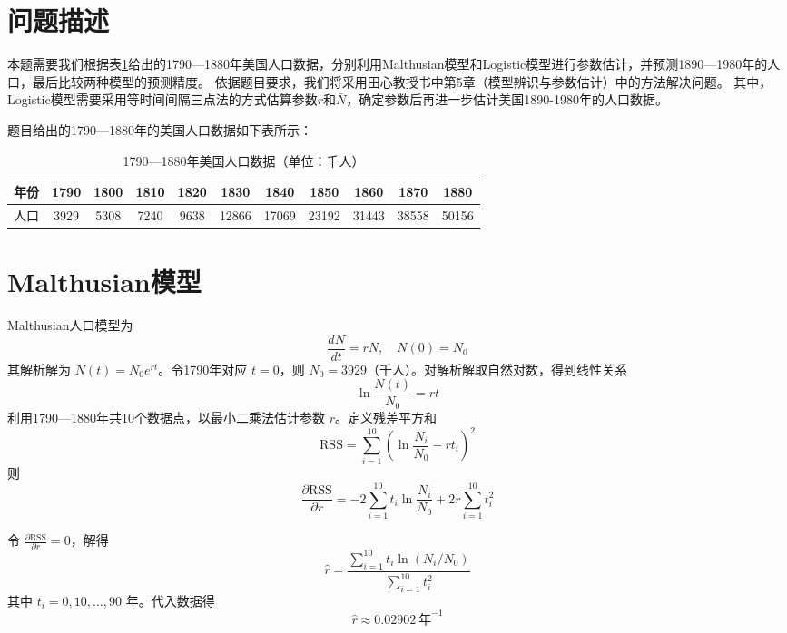 \section{问题描述}
本题需要我们根据表\ref{tab:data}给出的1790—1880年美国人口数据，分别利用Malthusian模型和Logistic模型进行参数估计，并预测1890—1980年的人口，最后比较两种模型的预测精度。
依据题目要求，我们将采用田心教授\cite{tianxin}书中第5章（模型辨识与参数估计）中的方法解决问题。
其中，Logistic模型需要采用等时间间隔三点法的方式估算参数$r$和$\bar{N}$，确定参数后再进一步估计美国1890-1980年的人口数据。
\par
题目给出的1790—1880年的美国人口数据如下表所示：
\begin{table}[h]
\centering
\caption{1790—1880年美国人口数据（单位：千人）}
\label{tab:data}
\begin{tabular}{ccccccccccc}
\toprule
年份 & 1790 & 1800 & 1810 & 1820 & 1830 & 1840 & 1850 & 1860 & 1870 & 1880 \\
\midrule
人口 & 3929 & 5308 & 7240 & 9638 & 12866 & 17069 & 23192 & 31443 & 38558 & 50156 \\
\bottomrule
\end{tabular}
\end{table}

\section{Malthusian模型}
Malthusian人口模型为
\begin{equation}
    \frac{dN}{dt} = rN,\quad N(0)=N_0
\end{equation}
其解析解为 $N(t)=N_0 e^{rt}$。令1790年对应 $t=0$，则 $N_0=3929$（千人）。对解析解取自然对数，得到线性关系
\begin{equation}
    \ln\frac{N(t)}{N_0}=rt
\end{equation}
利用1790—1880年共10个数据点，以最小二乘法估计参数 $r$。定义残差平方和
\begin{equation}
    \text{RSS}=\sum_{i=1}^{10}\left(\ln\frac{N_i}{N_0}-rt_i\right)^2
    \label{eq:rss}
\end{equation}
则
\begin{equation}
    \frac{\partial\text{RSS}}{\partial r}=-2\sum_{i=1}^{10} t_i \ln\frac{N_i}{N_0}+2r\sum_{i=1}^{10} t_i^2
\end{equation}
\par
令 $\frac{\partial\text{RSS}}{\partial r}=0$，解得
\begin{equation}
    \hat{r}=\frac{\sum_{i=1}^{10} t_i \ln(N_i/N_0)}{\sum_{i=1}^{10} t_i^2}
\end{equation}
其中 $t_i=0,10,\dots,90$ 年。代入数据得
\[
\hat{r} \approx 0.02902\ \text{年}^{-1}
\]


